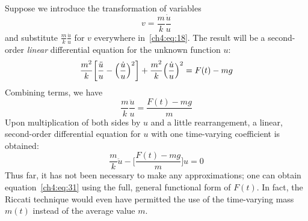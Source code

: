 Suppose we introduce the transformation of variables
\begin{equation*}
v = \frac{m}{k}\frac{\dot{u}}{u}
\end{equation*}
and substitute $\frac{m}{k}\frac{\dot{u}}{u}$ for $v$ everywhere in~\eqref{ch4:eq:18}. The result
will be a second-order \emph{linear} differential equation for the unknown function $u$:
\begin{equation}\label{ch4:eq:29}
\frac{m^{2}}{k}\biggl[\frac{\ddot{u}}{u} - \Bigl(\frac{\dot{u}}{u}\Bigr)^{2}\biggr]
  + \frac{m^{2}}{k}\Bigl(\frac{\dot{u}}{u}\Bigr)^{2} = F(t) - mg
\end{equation}
Combining terms, we have
\begin{equation}\label{ch4:eq:30}
\frac{m}{k}\frac{\ddot{u}}{u} = \frac{F(t) - mg}{m}
\end{equation}
Upon multiplication of both sides by $u$ and a little rearrangement, a linear, second-order
differential equation for $u$ with one time-varying coefficient is obtained:
\begin{equation}\label{ch4:eq:31}
\frac{m}{k}\ddot{u} - \biggl[\frac{F(t) - mg}{m}\biggr]u = 0
\end{equation}
Thus far, it has not been necessary to make any approximations; one can obtain
equation~\eqref{ch4:eq:31} using the full, general functional form of $F(t)$. In fact, the Riccati
technique would even have permitted the use of the time-varying mass $m(t)$ instead of the average
value $m$.

